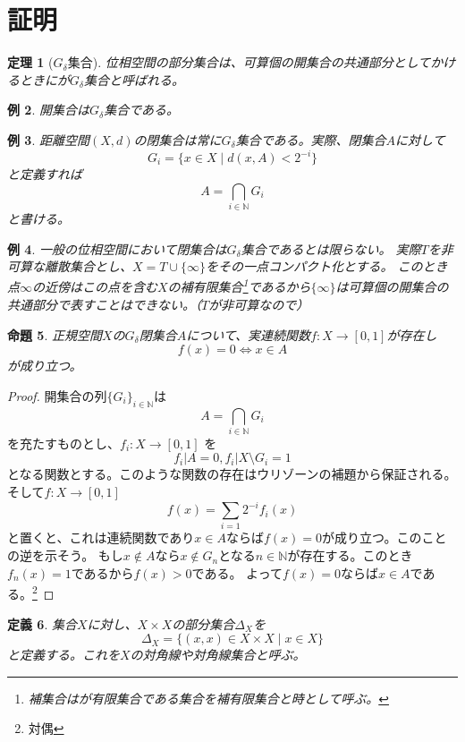 \documentclass[leqno]{jsarticle}
\newtheorem{thm}{定理}
\newtheorem{prop}[thm]{命題}
\newtheorem{df}[thm]{定義}
\newtheorem{exam}[thm]{例}
\newcommand{\nn}{\mathbb{N}}
\begin{document}
\section{証明}
\begin{thm}[$G_{\delta}$集合]
位相空間の部分集合は、可算個の開集合の共通部分としてかけるときにが$G_{\delta}$集合と呼ばれる。
\end{thm}

\begin{exam}
開集合は$G_{\delta}$集合である。
\end{exam}

\begin{exam}
距離空間$(X,d)$の閉集合は常に$G_{\delta}$集合である。実際、閉集合$A$に対して
\[
G_i=\{x\in X\mid d(x,A)<2^{-i}\}
\]
と定義すれば
\[
A=\bigcap_{i\in \nn}G_i
\]
と書ける。\par
\end{exam}

\begin{exam}
一般の位相空間において閉集合は$G_{\delta}$集合であるとは限らない。
実際$T$を非可算な離散集合とし、$X=T\cup\{\infty\}$をその一点コンパクト化とする。
このとき点$\infty$の近傍はこの点を含む$X$の補有限集合\footnote{補集合はが有限集合である集合を補有限集合と時として呼ぶ。}であるから$\{\infty\}$は可算個の開集合の共通部分で表すことはできない。（$T$が非可算なので）
\end{exam}

\begin{prop}\label{zero}
正規空間$X$の$G_{\delta}$閉集合$A$について、実連続関数$f:X\to [0,1]$が存在し
\[
f(x)=0\iff x\in A
\]
が成り立つ。
\end{prop}
\begin{proof}
開集合の列$\{G_i\}_{i\in \nn}$は
\[
A=\bigcap_{i\in \nn}G_i
\]
を充たすものとし、$f_i:X\to[0,1]$ を
\[
f_i|A=0, f_i|X\setminus G_i=1
\]
となる関数とする。このような関数の存在はウリゾーンの補題から保証される。そして$f:X\to [0,1]$
\[
f(x)=\sum_{i=1}2^{-i}f_i(x)
\]
と置くと、これは連続関数であり$x\in A$ならば$f(x)=0$が成り立つ。このことの逆を示そう。
もし$x\not\in A$なら$x\not\in G_n$となる$n\in \nn$が存在する。このとき$f_n(x)=1$であるから$f(x)>0$である。
よって$f(x)=0$ならば$x\in A$である。\footnote{対偶}
\end{proof}

\begin{df}
集合$X$に対し、$X\times X$の部分集合$\Delta_{X}$を
\[
\Delta_{X}=\{(x,x)\in X\times X\mid x\in X\}
\]
と定義する。これを$X$の対角線や対角線集合と呼ぶ。
\end{df}
\end{document}
